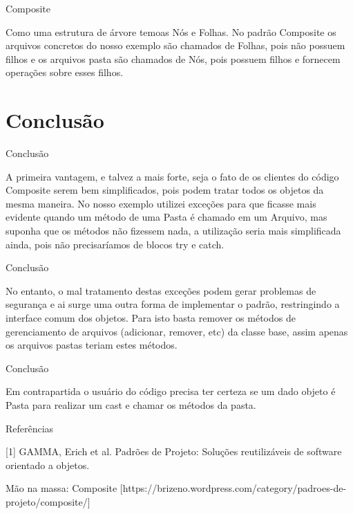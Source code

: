 \documentclass{beamer}
\begin{document}
\begin{frame}{Composite}

Como uma estrutura de árvore temoas Nós e Folhas. No padrão Composite os arquivos concretos do nosso exemplo são chamados de Folhas, pois não possuem filhos e os arquivos pasta são chamados de Nós, pois possuem filhos e fornecem operações sobre esses filhos.

\end{frame}

\section{Conclusão}
\begin{frame}{Conclusão}

A primeira vantagem, e talvez a mais forte, seja o fato de os clientes do código Composite serem bem simplificados, pois podem tratar todos os objetos da mesma maneira. No nosso exemplo utilizei exceções para que ficasse mais evidente quando um método de uma Pasta é chamado em um Arquivo, mas suponha que os métodos não fizessem nada, a utilização seria mais simplificada ainda, pois não precisaríamos de blocos try e catch.

\end{frame}

\begin{frame}{Conclusão}

No entanto, o mal tratamento destas exceções podem gerar problemas de segurança e ai surge uma outra forma de implementar o padrão, restringindo a interface comum dos objetos. Para isto basta remover os métodos de gerenciamento de arquivos (adicionar, remover, etc) da classe base, assim apenas os arquivos pastas teriam estes métodos.

\end{frame}

\begin{frame}{Conclusão}

Em contrapartida o usuário do código precisa ter certeza se um dado objeto é Pasta para realizar um cast e chamar os métodos da pasta. 

\end{frame}

\begin{frame}{Referências}

[1] GAMMA, Erich et al. Padrões de Projeto: Soluções reutilizáveis de software orientado a objetos.

Mão na massa: Composite [https://brizeno.wordpress.com/category/padroes-de-projeto/composite/]

\end{frame}
\end{document}
